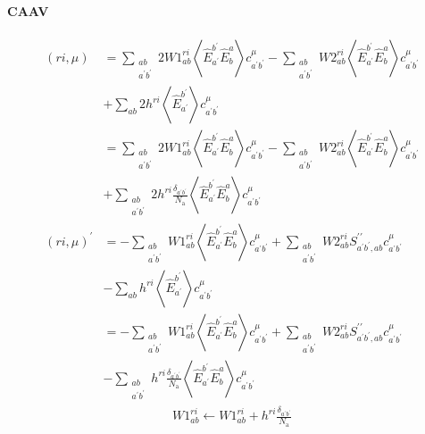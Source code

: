 \documentclass{article}
\newcommand  \equ[2]       {\begin{align}#2\label{#1}\end{align}}
\newcommand  \Expect[1]    {\left\langle  #1 \right\rangle}
\newcommand  \E[2]         {\hat{E}_{#1}^{#2}}
\renewcommand\P            {^\prime}
\begin{document}
\paragraph{CAAV}
\equ{ }{
  (ri,\mu)&=\sum_{\substack{ab\\ a\P b\P}} 2W1_{ab}^{ri}\Expect{\E{a\P}{b\P}\E{b}{a}} c_{a\P b\P}^\mu
           -\sum_{\substack{ab\\ a\P b\P}}  W2_{ab}^{ri}\Expect{\E{a\P}{b\P}\E{b}{a}} c_{a\P b\P}^\mu
          \nonumber\\&
           +\sum_{ab}                      2h^{ri}      \Expect{\E{a\P}{b\P}}         c_{a\P b\P}^\mu
          \nonumber\\&
           =\sum_{\substack{ab\\ a\P b\P}} 2W1_{ab}^{ri}\Expect{\E{a\P}{b\P}\E{b}{a}} c_{a\P b\P}^\mu
           -\sum_{\substack{ab\\ a\P b\P}}  W2_{ab}^{ri}\Expect{\E{a\P}{b\P}\E{b}{a}} c_{a\P b\P}^\mu
          \nonumber\\&
           +\sum_{\substack{ab\\ a\P b\P}} 2h^{ri}\frac{\delta_{a\P b\P}}{N_\text{a}}
                                                        \Expect{\E{a\P}{b\P}\E{b}{a}} c_{a\P b\P}^\mu
\nonumber\\                                                        
  (ri,\mu)\P
         &=-\sum_{\substack{ab\\ a\P b\P}}  W1_{ab}^{ri}\Expect{\E{a\P}{b\P}\E{b}{a}} c_{a\P b\P}^\mu
           +\sum_{\substack{ab\\ a\P b\P}}  W2_{ab}^{ri} S^{\prime\prime}_{a\P b\P,ab}c_{a\P b\P}^\mu
          \nonumber\\&
           -\sum_{ab}                       h^{ri}      \Expect{\E{a\P}{b\P}}         c_{a\P b\P}^\mu
          \nonumber\\&
          =-\sum_{\substack{ab\\ a\P b\P}}  W1_{ab}^{ri}\Expect{\E{a\P}{b\P}\E{b}{a}} c_{a\P b\P}^\mu
           +\sum_{\substack{ab\\ a\P b\P}}  W2_{ab}^{ri} S^{\prime\prime}_{a\P b\P,ab}c_{a\P b\P}^\mu
          \nonumber\\&
           -\sum_{\substack{ab\\ a\P b\P}}  h^{ri}\frac{\delta_{a\P b\P}}{N_\text{a}}
                                                        \Expect{\E{a\P}{b\P}\E{b}{a}} c_{a\P b\P}^\mu
}
\equ{ }{
  W1_{ab}^{ri}\leftarrow W1_{ab}^{ri}+h^{ri} \frac{\delta_{a\P b\P}}{N_\text{a}}
}
\end{document}
